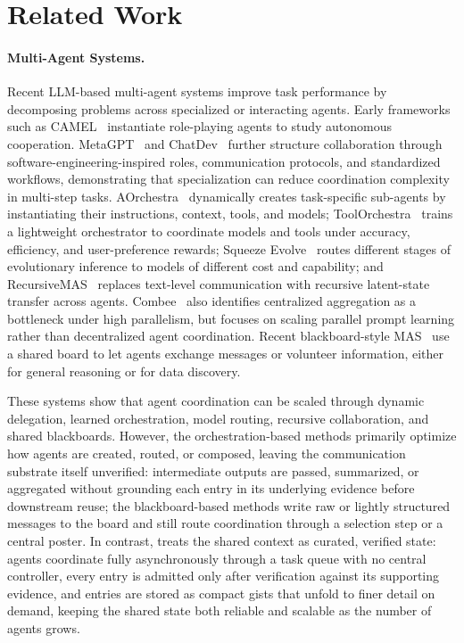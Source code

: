 \section{Related Work}
\label{sec:related_work}
\paragraph{Multi-Agent Systems.}
Recent LLM-based multi-agent systems improve task performance by decomposing problems across specialized or interacting agents. Early frameworks such as CAMEL~\citep{li2023camel} instantiate role-playing agents to study autonomous cooperation. MetaGPT~\citep{hong2023metagpt} and ChatDev~\citep{qian2024chatdev} further structure collaboration through software-engineering-inspired roles, communication protocols, and standardized workflows, demonstrating that specialization can reduce coordination complexity in multi-step tasks. AOrchestra~\citep{ruan2026aorchestra} dynamically creates task-specific sub-agents by instantiating their instructions, context, tools, and models; ToolOrchestra~\citep{su2025toolorchestra} trains a lightweight orchestrator to coordinate models and tools under accuracy, efficiency, and user-preference rewards; Squeeze Evolve~\citep{maheswaran2026squeeze} routes different stages of evolutionary inference to models of different cost and capability; and RecursiveMAS~\citep{yang2026recursive} replaces text-level communication with recursive latent-state transfer across agents.
Combee~\citep{li2026combee} also identifies centralized aggregation as a bottleneck under high parallelism, but focuses on scaling parallel prompt learning rather than decentralized agent coordination. Recent blackboard-style MAS~\citet{han2025exploring, salemi2025llm} use a shared board to let agents exchange messages or volunteer information, either for general reasoning or for data discovery.

These systems show that agent coordination can be scaled through dynamic delegation, learned orchestration, model routing, recursive collaboration, and shared blackboards. However, the orchestration-based methods primarily optimize how agents are created, routed, or composed, leaving the communication substrate itself unverified: intermediate outputs are passed, summarized, or aggregated without grounding each entry in its underlying evidence before downstream reuse; the blackboard-based methods write raw or lightly structured messages to the board and still route coordination through a selection step or a central poster. In contrast, \toolName{} treats the shared context as curated, verified state: agents coordinate fully asynchronously through a task queue with no central controller, every entry is admitted only after verification against its supporting evidence, and entries are stored as compact gists that unfold to finer detail on demand, keeping the shared state both reliable and scalable as the number of agents grows.


